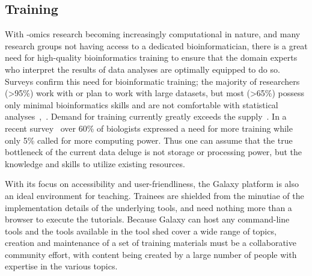 \begin{justify}
\subsection{Training}
With -omics research becoming increasingly computational in nature, and many research groups not having access to a dedicated bioinformatician, there is a great need for high-quality bioinformatics training to ensure that the domain experts who interpret the results of data analyses are optimally equipped to do so. Surveys confirm this need for bioinformatic training; the majority of researchers (>95\%) work with or plan to work with large datasets, but most (>65\%) possess only minimal bioinformatics skills and are not comfortable with statistical analyses~\cite{larcombe2017elixir},~\cite{williams2017vision}. Demand for training currently greatly exceeds the supply~\cite{attwood2017global}. In a recent survey~\cite{survey2013embl} over 60\% of biologists expressed a need for more training while only 5\% called for more computing power. Thus one can assume that the true bottleneck of the current data deluge is not storage or processing power, but the knowledge and skills to utilize existing resources.

With its focus on accessibility and user-friendliness, the Galaxy platform is also an ideal environment for teaching. Trainees are shielded from the minutiae of the implementation details of the underlying tools, and need nothing more than a browser to execute the tutorials. Because Galaxy can host any command-line tools and the tools available in the tool shed cover a wide range of topics, creation and maintenance of a set of training materials must be a collaborative community effort, with content being created by a large number of people with expertise in the various topics.




\end{justify}

